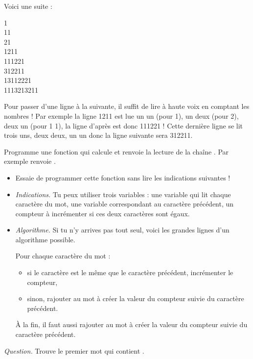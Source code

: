 \documentclass[11pt,class=report,crop=false]{standalone}
\begin{document}
\begin{activite}


Voici une suite :
\begin{center}
1 \\
11 \\
21 \\
1211 \\
111221 \\
312211 \\
13112221 \\
1113213211
\end{center}

Pour passer d'une ligne à la suivante, il suffit de lire à haute voix en comptant les nombres !
Par exemple la ligne 1211 est lue \og{}un un (pour 1), un deux (pour 2), deux un (pour 1 1)\fg{}, la ligne d'après est donc 111221 !
Cette dernière ligne se lit \og{}trois uns, deux deux, un un\fg{} donc la ligne suivante sera 312211.


Programme une fonction  qui calcule et renvoie la lecture de la chaîne .
Par exemple  renvoie .


\begin{itemize}
  \item Essaie de programmer cette fonction sans lire les indications suivantes !

  \item \emph{Indications.}
Tu peux utiliser trois variables : une variable qui lit chaque caractère du mot, une variable correspondant au caractère précédent, un compteur à incrémenter si ces deux caractères sont égaux.
  
  \item \emph{Algorithme.} 
  Si tu n'y arrives pas tout seul, voici les grandes lignes d'un algorithme possible.

Pour chaque caractère du mot :
\begin{itemize}
  \item si le caractère est le même que le caractère précédent, incrémenter le compteur,
  \item sinon, rajouter au mot à créer la valeur du compteur suivie du caractère précédent.
\end{itemize}
À la fin, il faut aussi rajouter au mot à créer la valeur du compteur suivie du caractère précédent.
\end{itemize}

\smallskip

\emph{Question.} Trouve le premier mot qui contient . 
\end{activite}
\end{document}

